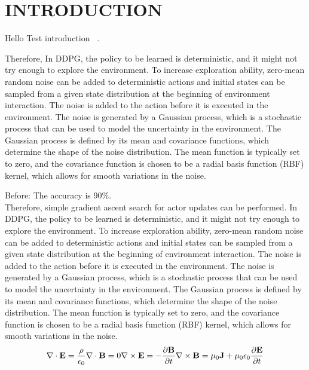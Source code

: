 \section{INTRODUCTION}

Hello Test introduction~ \cite{Sethian1996}.

Therefore, 
In DDPG, the policy to be learned is deterministic, and it might not try 
enough to explore the environment. To increase exploration ability, 
zero-mean random noise can be added to deterministic actions and initial 
states can be sampled from a given state distribution at the beginning 
of environment interaction. The noise is added to the action before it 
is executed in the environment. The noise is generated by a Gaussian process, 
which is a stochastic process that can be used to model the uncertainty in the environment. 
The Gaussian process is defined by its mean and covariance functions, 
which determine the shape of the noise distribution. The mean function is typically set to zero, 
and the covariance function is chosen to 
be a radial basis function (RBF) kernel, which allows for smooth variations in the noise.

\begin{reviewbox}{3.2} %
    Before: The accuracy is 90\%. \\
    Therefore, simple gradient ascent search for actor updates can be performed. 
    In DDPG, the policy to be learned is deterministic, and it might not try 
    enough to explore the environment. To increase exploration ability, 
    zero-mean random noise can be added to deterministic actions and initial 
    states can be sampled from a given state distribution at the beginning 
    of environment interaction. The noise is added to the action before it 
    is executed in the environment. The noise is generated by a Gaussian process, 
    which is a stochastic process that can be used to model the uncertainty in the environment. 
    The Gaussian process is defined by its mean and covariance functions, 
    which determine the shape of the noise distribution. The mean function is typically set to zero, 
    and the covariance function is chosen to 
    be a radial basis function (RBF) kernel, which allows for smooth variations in the noise.
    $$
    \nabla \cdot \mathbf{E} = \frac{\rho}{\epsilon_0} \\ 
    \nabla \cdot \mathbf{B} = 0 \\ 
    \nabla \times \mathbf{E} = -\frac{\partial \mathbf{B}}{\partial t} \\ 
    \nabla \times \mathbf{B} = \mu_0 \mathbf{J} + \mu_0 \epsilon_0 \frac{\partial \mathbf{E}}{\partial t}
    $$
\end{reviewbox}

